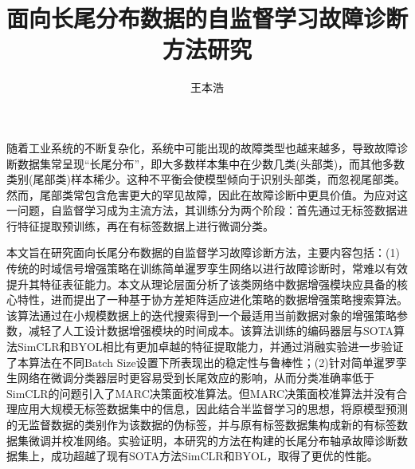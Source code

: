 \documentclass[master]{thesis-uestc}
\title{面向长尾分布数据的自监督学习故障诊断方法研究}{}
\author{王本浩}{Wang Benhao}
\begin{document}
\makecover

\begin{chineseabstract}
    随着工业系统的不断复杂化，系统中可能出现的故障类型也越来越多，导致故障诊断数据集常呈现“长尾分布”，即大多数样本集中在少数几类(头部类)，而其他多数类别(尾部类)样本稀少。这种不平衡会使模型倾向于识别头部类，而忽视尾部类。然而，尾部类常包含危害更大的罕见故障，因此在故障诊断中更具价值。为应对这一问题，自监督学习成为主流方法，其训练分为两个阶段：首先通过无标签数据进行特征提取预训练，再在有标签数据上进行微调分类。

    本文旨在研究面向长尾分布数据的自监督学习故障诊断方法，主要内容包括：(1)传统的时域信号增强策略在训练简单暹罗孪生网络以进行故障诊断时，常难以有效提升其特征表征能力。本文从理论层面分析了该类网络中数据增强模块应具备的核心特性，进而提出了一种基于协方差矩阵适应进化策略的数据增强策略搜索算法。该算法通过在小规模数据上的迭代搜索得到一个最适用当前数据对象的增强策略参数，减轻了人工设计数据增强模块的时间成本。该算法训练的编码器层与SOTA算法SimCLR和BYOL相比有更加卓越的特征提取能力，并通过消融实验进一步验证了本算法在不同Batch Size设置下所表现出的稳定性与鲁棒性；(2)针对简单暹罗孪生网络在微调分类器层时更容易受到长尾效应的影响，从而分类准确率低于SimCLR的问题引入了MARC决策面校准算法。但MARC决策面校准算法并没有合理应用大规模无标签数据集中的信息，因此结合半监督学习的思想，将原模型预测的无监督数据的类别作为该数据的伪标签，并与原有标签数据集构成新的有标签数据集微调并校准网络。实验证明，本研究的方法在构建的长尾分布轴承故障诊断数据集上，成功超越了现有SOTA方法SimCLR和BYOL，取得了更优的性能。

\end{chineseabstract}
\end{document}
